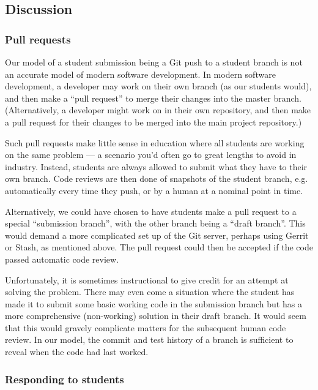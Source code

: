 \subsection{Discussion}

\subsubsection{Pull requests}

Our model of a student submission being a Git push to a student branch is not
an accurate model of modern software development. In modern software
development, a developer may work on their own branch (as our students would),
and then make a ``pull request'' to merge their changes into the master branch.
(Alternatively, a developer might work on in their own repository, and then
make a pull request for their changes to be merged into the main project
repository\cite{bird-et-al-2009}.)

Such pull requests make little sense in education where all students are
working on the same problem --- a scenario you'd often go to great lengths to
avoid in industry. Instead, students are always allowed to submit what they
have to their own branch. Code reviews are then done of snapshots of the
student branch, e.g. automatically every time they push, or by a human at a
nominal point in time.

Alternatively, we could have chosen to have students make a pull request to a
special ``submission branch'', with the other branch being a ``draft branch''.
This would demand a more complicated set up of the Git server, perhaps using
Gerrit or Stash, as mentioned above. The pull request could then be accepted
if the code passed automatic code review.

Unfortunately, it is sometimes instructional to give credit for an attempt at
solving the problem. There may even come a situation where the student has made
it to submit some basic working code in the submission branch but has a more
comprehensive (non-working) solution in their draft branch. It would seem that
this would gravely complicate matters for the subsequent human code review. In
our model, the commit and test history of a branch is sufficient to reveal when
the code had last worked.

\subsubsection{Responding to students}

